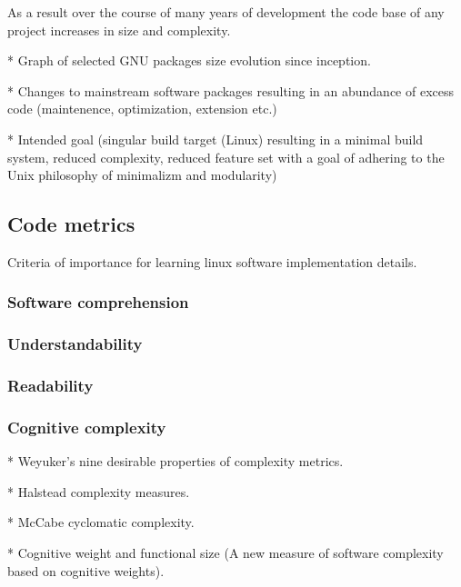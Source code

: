 As a result over the course of many years of development the code base of any project increases in size and complexity.

* Graph of selected GNU packages size evolution since inception.

* Changes to mainstream software packages resulting in an abundance of excess code (maintenence, optimization, extension etc.)

* Intended goal (singular build target (Linux) resulting in a minimal build system, reduced complexity, reduced feature set with a goal of adhering to the Unix philosophy of minimalizm and modularity)


\subsection{Code metrics}

Criteria of importance for learning linux software implementation details.

\subsubsection{Software comprehension}

\subsubsection{Understandability}

\subsubsection{Readability}

\subsubsection{Cognitive complexity}

* Weyuker's nine desirable properties of complexity metrics.

* Halstead complexity measures.

* McCabe cyclomatic complexity.

* Cognitive weight and functional size (A new measure of software complexity based on cognitive weights).
